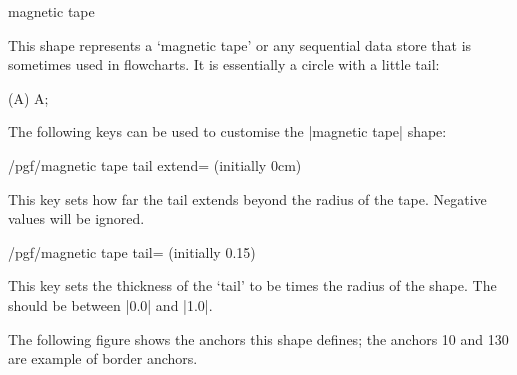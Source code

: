 \begin{shape}{magnetic tape}
	
	This shape represents a `magnetic tape' or any sequential data store
	that is sometimes used in flowcharts. It is essentially a circle with a 
	little tail:
		
\begin{codeexample}[]
\tikz{} (A) {A};
\end{codeexample}

	The following keys can be used to customise the |magnetic tape|
	shape:


\begin{key}{/pgf/magnetic tape tail extend= (initially 0cm)}
	
	This key sets how far the tail extends beyond the radius of
	the tape. Negative values will be ignored.
	
\begin{codeexample}[]
\end{codeexample}
\end{key}



\begin{key}{/pgf/magnetic tape tail= (initially 0.15)}
	
	This key sets the thickness of the `tail' to be 
	times the radius of the shape. The  should be 
	between |0.0| and |1.0|. 
	
\begin{codeexample}[]
\end{codeexample}
\end{key}


	The following figure shows the anchors this shape defines; 
	the anchors 10 and 130 are example of border anchors.
	

\end{shape}
